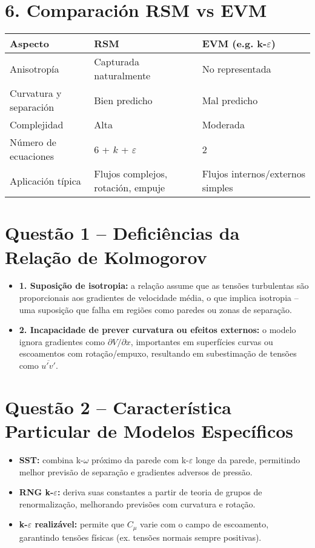 \documentclass[a4paper,12pt]{article}
\begin{document}
	\section*{6. Comparación RSM vs EVM}
	
	\begin{tabular}{|l|p{6.5cm}|p{6.5cm}|}
		\hline
		Aspecto & RSM & EVM (e.g. k-$\varepsilon$) \\
		\hline
		Anisotropía & Capturada naturalmente & No representada \\
		Curvatura y separación & Bien predicho & Mal predicho \\
		Complejidad & Alta & Moderada \\
		Número de ecuaciones & 6 + $k$ + $\varepsilon$ & 2 \\
		Aplicación típica & Flujos complejos, rotación, empuje & Flujos internos/externos simples \\
		\hline
	\end{tabular}
	
\section*{Questão 1 – Deficiências da Relação de Kolmogorov}

\begin{itemize}
	\item \textbf{1. Suposição de isotropia:} a relação assume que as tensões turbulentas são proporcionais aos gradientes de velocidade média, o que implica isotropia – uma suposição que falha em regiões como paredes ou zonas de separação.
	\item \textbf{2. Incapacidade de prever curvatura ou efeitos externos:} o modelo ignora gradientes como \( \partial V/\partial x \), importantes em superfícies curvas ou escoamentos com rotação/empuxo, resultando em subestimação de tensões como \( \overline{u'v'} \).
\end{itemize}

\section*{Questão 2 – Característica Particular de Modelos Específicos}

\begin{itemize}
	\item \textbf{SST:} combina k-$\omega$ próximo da parede com k-$\varepsilon$ longe da parede, permitindo melhor previsão de separação e gradientes adversos de pressão.
	\item \textbf{RNG k-$\varepsilon$:} deriva suas constantes a partir de teoria de grupos de renormalização, melhorando previsões com curvatura e rotação.
	\item \textbf{k-$\varepsilon$ realizável:} permite que \( C_\mu \) varie com o campo de escoamento, garantindo tensões físicas (ex. tensões normais sempre positivas).
\end{itemize}
\end{document}
